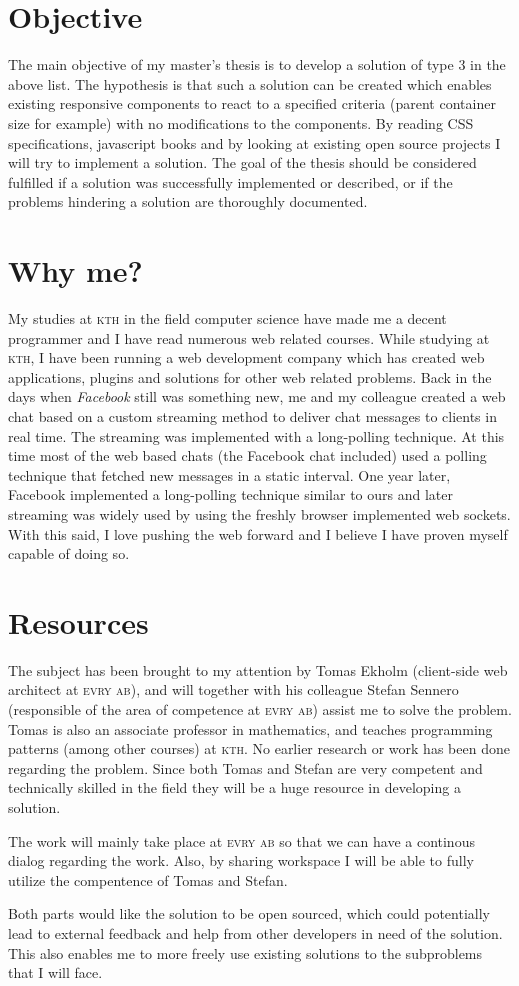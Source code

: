 \documentclass[oneside,a4paper,11pt]{kth-mag}
\begin{document}
\section*{Objective}
The main objective of my master's thesis is to develop a solution of type 3 in the above list. The hypothesis is that such a solution can be created which enables existing responsive components to react to a specified criteria (parent container size for example) with no modifications to the components. By reading CSS specifications, javascript books and by looking at existing open source projects I will try to implement a solution. The goal of the thesis should be considered fulfilled if a solution was successfully implemented or described, or if the problems hindering a solution are thoroughly documented.

\section*{Why me?}
My studies at \textsc{kth} in the field computer science have made me a decent programmer and I have read numerous web related courses. While studying at \textsc{kth}, I have been running a web development company which has created web applications, plugins and solutions for other web related problems. Back in the days when \emph{Facebook} still was something new, me and my colleague created a web chat based on a custom streaming method to deliver chat messages to clients in real time. The streaming was implemented with a long-polling technique. At this time most of the web based chats (the Facebook chat included) used a polling technique that fetched new messages in a static interval. One year later, Facebook implemented a long-polling technique similar to ours and later streaming was widely used by using the freshly browser implemented web sockets. With this said, I love pushing the web forward and I believe I have proven myself capable of doing so.

\section*{Resources}
The subject has been brought to my attention by Tomas Ekholm (client-side web architect at \textsc{evry ab}), and will together with his colleague Stefan Sennero (responsible of the area of competence at \textsc{evry ab}) assist me to solve the problem. Tomas is also an associate professor in mathematics, and teaches programming patterns (among other courses) at \textsc{kth}. No earlier research or work has been done regarding the problem. Since both Tomas and Stefan are very competent and technically skilled in the field they will be a huge resource in developing a solution.

The work will mainly take place at \textsc{evry ab} so that we can have a continous dialog regarding the work. Also, by sharing workspace I will be able to fully utilize the compentence of Tomas and Stefan.

Both parts would like the solution to be open sourced, which could potentially lead to external feedback and help from other developers in need of the solution. This also enables me to more freely use existing solutions to the subproblems that I will face.
\end{document}
